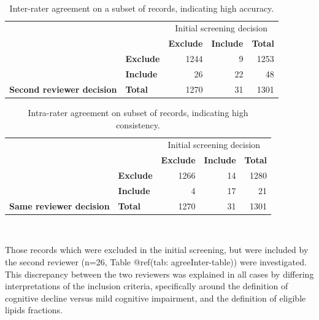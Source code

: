 \documentclass[a4paper, twoside]{templates/ociamthesis}
\begin{document}
~





\begin{table}[H]

\caption[Inter-rater agreement]{\label{tab:agreeInter-table}Inter-rater agreement on a subset of records, indicating high accuracy.}
\centering
\begin{tabular}[t]{>{}l>{}lr>{}r|r}
\toprule
\multicolumn{2}{c}{ } & \multicolumn{3}{c}{Initial screening decision} \\
\cmidrule(l{3pt}r{3pt}){3-5}
\textbf{} & \textbf{} & \textbf{Exclude} & \textbf{Include} & \textbf{Total}\\
\midrule
 & \textbf{Exclude} & 1244 & 9 & 1253\\
\cmidrule{2-5}
 & \textbf{Include} & 26 & 22 & 48\\
\cmidrule{2-5}
\multirow{-3}{*}{\raggedright\arraybackslash \textbf{Second reviewer decision}} & \textbf{Total} & 1270 & 31 & 1301\\
\bottomrule
\end{tabular}
\end{table}





\begin{table}[H]

\caption[Inter-rater agreement]{\label{tab:agreeIntra-table}Intra-rater agreement on subset of records, indicating high consistency.}
\centering
\begin{tabular}[t]{>{}l>{}lr>{}r|r}
\toprule
\multicolumn{2}{c}{ } & \multicolumn{3}{c}{Initial screening decision} \\
\cmidrule(l{3pt}r{3pt}){3-5}
\textbf{} & \textbf{} & \textbf{Exclude} & \textbf{Include} & \textbf{Total}\\
\midrule
 & \textbf{Exclude} & 1266 & 14 & 1280\\
\cmidrule{2-5}
 & \textbf{Include} & 4 & 17 & 21\\
\cmidrule{2-5}
\multirow{-3}{*}{\raggedright\arraybackslash \textbf{Same reviewer decision}} & \textbf{Total} & 1270 & 31 & 1301\\
\bottomrule
\end{tabular}
\end{table}

~

Those records which were excluded in the initial screening, but were included by the second reviewer (n=26, Table @ref(tab: agreeInter-table)) were investigated. This discrepancy between the two reviewers was explained in all cases by differing interpretations of the inclusion criteria, specifically around the definition of cognitive decline versus mild cognitive impairment, and the definition of eligible lipids fractions.
\end{document}
